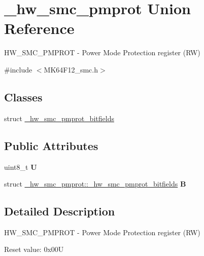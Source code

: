 \hypertarget{union__hw__smc__pmprot}{}\section{\+\_\+hw\+\_\+smc\+\_\+pmprot Union Reference}
\label{union__hw__smc__pmprot}


H\+W\+\_\+\+S\+M\+C\+\_\+\+P\+M\+P\+R\+OT -\/ Power Mode Protection register (RW)  




{\ttfamily \#include $<$M\+K64\+F12\+\_\+smc.\+h$>$}

\subsection*{Classes}
\begin{DoxyCompactItemize}
\item 
struct \hyperlink{struct__hw__smc__pmprot_1_1__hw__smc__pmprot__bitfields}{\+\_\+hw\+\_\+smc\+\_\+pmprot\+\_\+bitfields}
\end{DoxyCompactItemize}
\subsection*{Public Attributes}
\begin{DoxyCompactItemize}
\item 
uint8\+\_\+t {\bfseries U}\hypertarget{union__hw__smc__pmprot_a31ec9b5675040e2dc78609a32fc81f2d}{}\label{union__hw__smc__pmprot_a31ec9b5675040e2dc78609a32fc81f2d}

\item 
struct \hyperlink{struct__hw__smc__pmprot_1_1__hw__smc__pmprot__bitfields}{\+\_\+hw\+\_\+smc\+\_\+pmprot\+::\+\_\+hw\+\_\+smc\+\_\+pmprot\+\_\+bitfields} {\bfseries B}\hypertarget{union__hw__smc__pmprot_a233cb4cbc32a25bf935887a5a3eb0842}{}\label{union__hw__smc__pmprot_a233cb4cbc32a25bf935887a5a3eb0842}

\end{DoxyCompactItemize}


\subsection{Detailed Description}
H\+W\+\_\+\+S\+M\+C\+\_\+\+P\+M\+P\+R\+OT -\/ Power Mode Protection register (RW) 

Reset value\+: 0x00U


